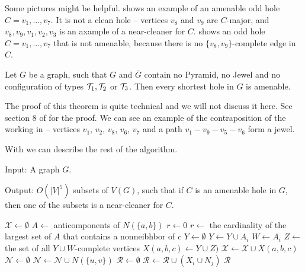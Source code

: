 Some pictures might be helpful.  shows an example of an amenable odd hole $C = v_1, \ldots, v_7$. It is not a clean hole -- vertices $v_8$ and $v_9$ are $C$-major, and $v_8, v_9, v_1, v_2, v_3$ is an axample of a near-cleaner for $C$.
 shows an odd hole $C = v_1, \ldots, v_7$ that is not amenable, because there is no $\{v_8, v_9\}$-complete edge in $C$.

\begin{theorem}
	\label{thm:amenableHoles}
	Let $G$ be a graph, such that $G$ and $\overline{G}$ contain no Pyramid, no Jewel and no configuration of types $\mathcal{T}_1, \mathcal{T}_2$ or $\mathcal{T}_3$. Then every shortest hole in $G$ is amenable.
\end{theorem}

The proof of this theorem is quite technical and we will not discuss it here. See section 8 of \cite{MC05} for the proof. We can see an example of the contraposition of the  working in  -- vertices $v_1$, $v_2$, $v_8$, $v_6$, $v_7$ and a path $v_1-v_9-v_5-v_6$ form a jewel.

With  we can describe the rest of the algorithm.

\begin{alg}
	\label{alg:listNearCleaners}
	Input: A graph $G$.

	\noindent Output: $O(|V|^5)$ subsets of $V(G)$, such that if $C$ is an amenable hole in $G$, then one of the subsets is a near-cleaner for $C$.
\end{alg}

\begin{algorithmic}[1]
	\ls $\mathcal{X} \gets \emptyset$
		\ls $A \gets$ anticomponents of $N(\{a, b\})$
			\ls $r \gets 0$
		\mElse
			\ls $r \gets$ the cardinality of the largest set of $A$ that contains 
			\lsx a nonneibhbor of $c$ 
		\mEndIf
		\ls $Y \gets \emptyset$ 
				\ls $Y \gets Y \cup A_i$
			\mEndIf
				\ls $W \gets A_i$
			\mEndIf
		\mEndFor
		\ls $Z \gets$ the set of all $Y \cup W$-complete vertices
		\ls $X(a, b, c) \gets Y \cup Z)$ 
		\ls $\mathcal{X} \gets \mathcal{X} \cup X(a, b, c)$
	\mEndFor
	\ls $\mathcal{N} \gets \emptyset$
		\ls $\mathcal{N} \gets \mathcal{N} \cup N(\{u, v\})$
	\mEndFor
	\ls $\mathcal{R} \gets \emptyset$
			\ls $\mathcal{R} \gets \mathcal{R} \cup (X_i \cup N_j)$
		\mEndFor
	\mEndFor
	\ls \RETURN $\mathcal{R}$
	\mEndProcedure
\end{algorithmic}


